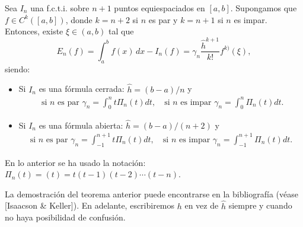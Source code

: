 \begin{theorem}
  \label{thm:error.formulas-nc}
  Sea $I_n$ una f.c.t.i. sobre $n+1$ puntos equiespaciados en
  $[a,b]$. Supongamos que $f\in C^k([a,b])$, donde $k=n+2$ si $n$ es par
  y $k=n+1$ si $n$ es impar. Entonces, existe $\xi\in(a,b)$ tal que
  \begin{equation}
  \label{eq:error-formulas-nc} 
  E_n(f)=\int_a^bf(x)\,dx - I_n(f)
    = \gamma_n \frac{\widehat h^{k+1}}{k!}f^{k)}(\xi),
  \end{equation}
  siendo:
  \begin{itemize}
  \item Si $I_n$ es una fórmula cerrada: $\widehat h=(b-a)/n$ y
    \begin{align*}
      \text{ si $n$ es par }
      \gamma_n=\int_0^n t \Pi_n(t) dt,
      \quad \text{si $n$ es impar }
          \gamma_n=\int_0^n \Pi_n(t) dt.
    \end{align*}
  \item Si $I_n$ es una fórmula abierta: $\widehat h=(b-a)/(n+2)$ y
    \begin{align*}
      \text{si $n$ es par }
      \gamma_n=\int_{-1}^{n+1} t \Pi_n(t) dt,
      \quad \text{si $n$ es impar }
      \gamma_n=\int_{-1}^{n+1} \Pi_n(t) dt.
    \end{align*}
  \end{itemize}
  En lo anterior se ha usado la notación:
  $\Pi_n(t)=(t)=t(t-1)(t-2)\cdots (t-n)$.
\end{theorem}

La demostración del teorema anterior puede encontrarse en la
bibliografía (véase [Isaacson \& Keller]).  En adelante, escribiremos
$h$ en vez de $\widehat h$ siempre y cuando no haya posibilidad de
confusión.

